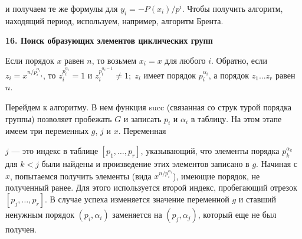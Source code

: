 \documentclass{mai_book}
\begin{document}
\medskip
\noindent и получаем те же формулы для $y_i=-P(x_i)/p^i$. Чтобы получить алгоритм, находящий период, используем, например, алгоритм Брента.

\newpage


\textbf{16. Поиск образующих элементов циклических групп}

\medskip
Если порядок $x$ равен $n$, то возьмем $x_i=x$ для любого $i$. Обратно, если $z_i=x^{{n/p^{\alpha_i}_i}_i}$, то $z_i^{p_i^{\alpha_i}}=1$ и $z_i^{p_i^{\alpha_i-1}}\neq 1;\; z_i$ имеет порядок $p_i^{\alpha_i}$, а
порядок $z_1\dots z_r$ равен $n$.

Перейдем к алгоритму. В нем функция succ (связанная со струк­
турой порядка группы) позволяет пробежать $G$ и записать $p_i$ и $\alpha_i$ в таблицу. На этом этапе имеем три переменных $g$, $j$ и $x$. Переменная
$j$ --- это индекс в таблице $[p_1,\dots,p_r]$, указывающий, что эле­менты порядка $p_k^{\alpha_k}$ для $k<j$
были найдены и произведение
этих элементов записано в $g$.
Начиная с $x$, попытаемся по­лучить элементы (вида $x^{n/p_i^{\alpha_i}}$),
имеющие порядок, не полученный ранее. Для этого исполь­зуется второй индекс, пробе­гающий отрезок $[p_j,\dots,p_r]$. В
случае успеха изменяется зна­чение переменной $g$ и ставший
ненужным порядок $(p_i,\alpha_i)$ за­меняется на $(p_j,\alpha_j)$, который еще не был получен.
\end{document}
